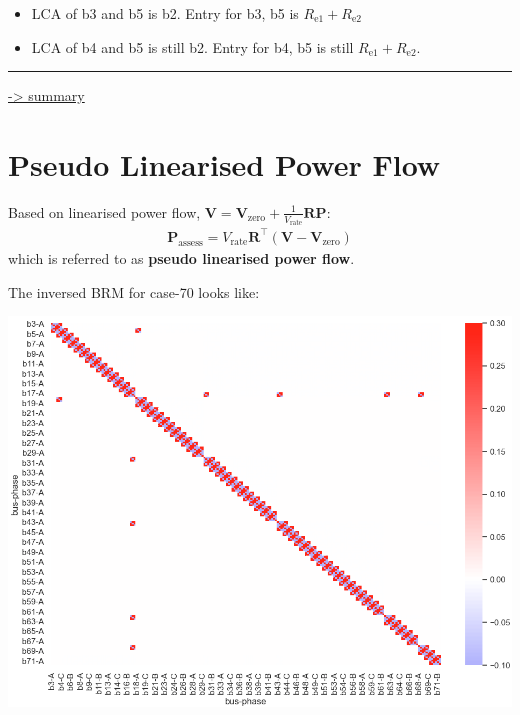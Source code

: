 \documentclass[
]{book}
\providecommand{\tightlist}{%
  \setlength{\itemsep}{0pt}\setlength{\parskip}{0pt}}
\begin{document}
\begin{itemize}
\tightlist
\item
  LCA of b3 and b5 is b2. Entry for b3, b5 is \(R_\text{e1} + R_\text{e2}\)
\item
  LCA of b4 and b5 is still b2. Entry for b4, b5 is still \(R_\text{e1} + R_\text{e2}\).
\end{itemize}

\begin{center}\rule{0.5\linewidth}{0.5pt}\end{center}

\protect\hyperlink{summary}{-\textgreater{} summary}

\hypertarget{pseudo-linearised-power-flow}{%
\section{Pseudo Linearised Power Flow}\label{pseudo-linearised-power-flow}}

Based on linearised power flow, \(\boldsymbol{V} = \boldsymbol{V}_\text{zero} + \frac{1}{V_\text{rate}} \boldsymbol{R} \boldsymbol{P}\):
\[ \begin{aligned}
    \boldsymbol{P}_\text{assess} =
    V_\text{rate} \boldsymbol{R}^{\top}
    \left( \boldsymbol{V} - \boldsymbol{V}_\text{zero} \right)
\end{aligned} \]
which is referred to as \textbf{pseudo linearised power flow}.

The inversed BRM for case-70 looks like:

\begin{center}\includegraphics{Pictures/figHeatmapBrmInv} \end{center}
\end{document}
